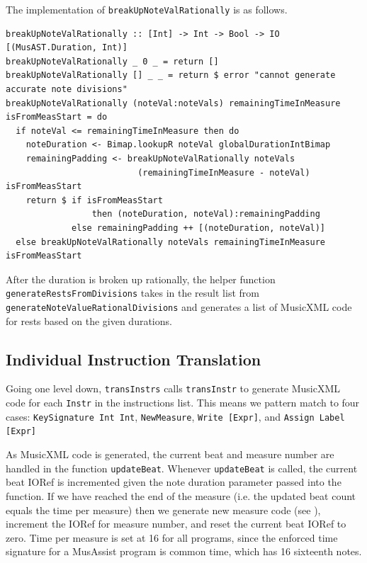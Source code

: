 \documentclass{report}
\begin{document}
The implementation of \verb.breakUpNoteValRationally. is as follows.

\begin{verbatim}
breakUpNoteValRationally :: [Int] -> Int -> Bool -> IO [(MusAST.Duration, Int)]
breakUpNoteValRationally _ 0 _ = return []
breakUpNoteValRationally [] _ _ = return $ error "cannot generate accurate note divisions" 
breakUpNoteValRationally (noteVal:noteVals) remainingTimeInMeasure isFromMeasStart = do
  if noteVal <= remainingTimeInMeasure then do
    noteDuration <- Bimap.lookupR noteVal globalDurationIntBimap 
    remainingPadding <- breakUpNoteValRationally noteVals 
                          (remainingTimeInMeasure - noteVal) isFromMeasStart
    return $ if isFromMeasStart 
                 then (noteDuration, noteVal):remainingPadding 
             else remainingPadding ++ [(noteDuration, noteVal)]
  else breakUpNoteValRationally noteVals remainingTimeInMeasure isFromMeasStart
\end{verbatim}

After the duration is broken up rationally, the helper function \verb.generateRestsFromDivisions. takes in the result list from  \verb.generateNoteValueRationalDivisions. and generates a list of MusicXML code for rests based on the given durations.

\subsection{Individual Instruction Translation}
Going one level down, \verb.transInstrs. calls \verb.transInstr. to generate MusicXML code for each \verb.Instr. in the instructions list. This means we pattern match to four cases: \verb.KeySignature Int Int., \verb.NewMeasure., \verb.Write [Expr]., and \verb.Assign Label [Expr]. 

As MusicXML code is generated, the current beat and measure number are handled in the function \verb.updateBeat.. Whenever \verb.updateBeat. is called, the current beat IORef is incremented given the note duration parameter passed into the function. If we have reached the end of the measure (i.e. the updated beat count equals the time per measure) then we generate new measure code (see ), increment the IORef for measure number, and reset the current beat IORef to zero. Time per measure is set at 16 for all programs, since the enforced time signature for a MusAssist program is common time, which has 16 sixteenth notes. 
\end{document}
